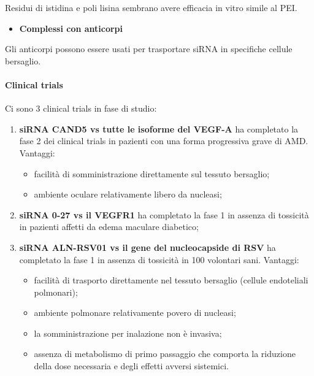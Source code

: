 \documentclass[]{article}
\begin{document}
Residui di istidina e poli lisina sembrano avere efficacia in vitro
simile al PEI.

\begin{itemize}
\itemsep1pt\parskip0pt
\item
  \textbf{Complessi con anticorpi}
\end{itemize}

Gli anticorpi possono essere usati per trasportare siRNA in specifiche
cellule bersaglio.

\paragraph{Clinical trials}\label{clinical-trials}

Ci sono 3 clinical trials in fase di studio:

\begin{enumerate}
\def\labelenumi{\arabic{enumi}.}
\item
  \textbf{siRNA CAND5 vs tutte le isoforme del VEGF-A} ha completato la
  fase 2 dei clinical trials in pazienti con una forma progressiva grave
  di AMD. Vantaggi:

  \begin{itemize}
  \itemsep1pt\parskip0pt
  \item
    facilità di somministrazione direttamente sul tessuto bersaglio;
  \item
    ambiente oculare relativamente libero da nucleasi;
  \end{itemize}
\item
  \textbf{siRNA 0-27 vs il VEGFR1} ha completato la fase 1 in assenza di
  tossicità in pazienti affetti da edema maculare diabetico;
\item
  \textbf{siRNA ALN-RSV01 vs il gene del nucleocapside di RSV} ha
  completato la fase 1 in assenza di tossicità in 100 volontari sani.
  Vantaggi:

  \begin{itemize}
  \itemsep1pt\parskip0pt
  \item
    facilità di trasporto direttamente nel tessuto bersaglio (cellule
    endoteliali polmonari);
  \item
    ambiente polmonare relativamente povero di nucleasi;
  \item
    la somministrazione per inalazione non è invasiva;
  \item
    assenza di metabolismo di primo passaggio che comporta la riduzione
    della dose necessaria e degli effetti avversi sistemici.
  \end{itemize}
\end{enumerate}
\end{document}
